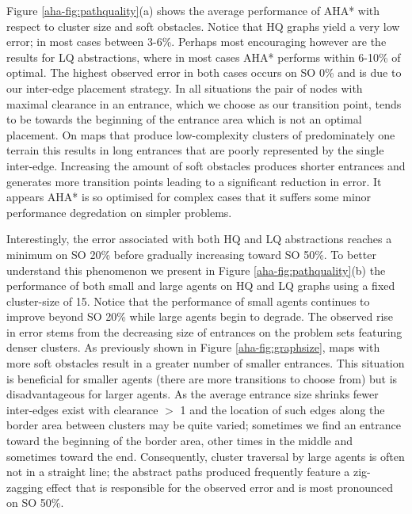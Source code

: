 \par \indent
Figure \ref{aha-fig:pathquality}(a) shows the average performance of AHA* with respect to cluster size and soft obstacles.  
Notice that HQ graphs yield a very low error; in most cases between 3-6\%. 
Perhaps most encouraging however are the results for LQ abstractions, where in most cases AHA* performs within 6-10\% of optimal. 
The highest observed error in both cases occurs on SO 0\% and is due to our inter-edge placement strategy.
In all situations the pair of nodes with maximal clearance in an entrance, which we choose as our transition point, tends to be towards the beginning of the entrance area which is not an optimal placement.
On maps that produce low-complexity clusters of predominately one terrain this results in long entrances that are poorly represented by the single inter-edge.
Increasing the amount of soft obstacles produces shorter entrances and generates more transition points leading to a significant reduction in error. 
It appears AHA* is so optimised for complex cases that it suffers some minor performance degredation on simpler problems. 
\par \indent
Interestingly, the error associated with both HQ and LQ abstractions reaches a minimum on SO 20\% before gradually increasing toward SO 50\%. 
To better understand this phenomenon we present in Figure \ref{aha-fig:pathquality}(b) the performance of both small and large agents on HQ and LQ graphs using a fixed cluster-size of 15.
Notice that the performance of small agents continues to improve beyond SO 20\% while large agents begin to degrade.
The observed rise in error stems from the decreasing size of entrances on the problem sets featuring denser clusters. 
As previously shown in Figure \ref{aha-fig:graphsize}, maps with more soft obstacles result in a greater number of smaller entrances. 
This situation is beneficial for smaller agents (there are more transitions to choose from) but is disadvantageous for larger agents.
As the average entrance size shrinks fewer inter-edges exist with clearance $>$ 1 and the location of such edges along the border area between clusters may be quite varied; sometimes we find an entrance toward the beginning of the border area, other times in the middle and sometimes toward the end.
Consequently, cluster traversal by large agents is often not in a straight line; the abstract paths produced frequently feature a zig-zagging effect that is responsible for the observed error and is most pronounced on SO 50\%.
